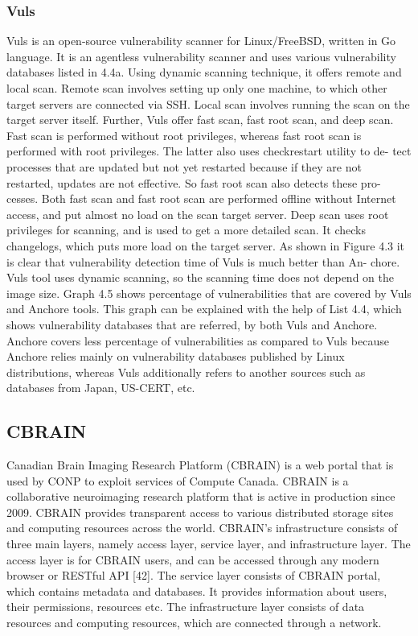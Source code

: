 \documentclass[a4paper,num-refs]{oup-contemporary}
\begin{document}
\subsubsection{Vuls}

Vuls is an open-source vulnerability scanner for Linux/FreeBSD, written in Go
language. It is an agentless vulnerability scanner and uses various
vulnerability databases listed in 4.4a. Using dynamic scanning technique, it offers
remote and local scan. Remote scan involves setting up only one machine, to
which other target servers are connected via SSH. Local scan involves running
the scan on the target server itself. Further, Vuls offer fast scan, fast root scan,
and deep scan.
Fast scan is performed without root privileges, whereas fast root scan is
performed with root privileges. The latter also uses checkrestart utility to de-
tect processes that are updated but not yet restarted because if they are not
restarted, updates are not effective. So fast root scan also detects these pro-
cesses. Both fast scan and fast root scan are performed offline without Internet
access, and put almost no load on the scan target server. Deep scan uses
root privileges for scanning, and is used to get a more detailed scan. It checks
changelogs, which puts more load on the target server. As shown in Figure 4.3
it is clear that vulnerability detection time of Vuls is much better than An-
chore. Vuls tool uses dynamic scanning, so the scanning time does not depend
on the image size.
Graph 4.5 shows percentage of vulnerabilities that are
covered by Vuls and Anchore tools. This graph can be explained with the help
of List 4.4, which shows vulnerability databases that are referred, by both Vuls
and Anchore. Anchore covers less percentage of vulnerabilities as compared
to Vuls because Anchore relies mainly on vulnerability databases published by
Linux distributions, whereas Vuls additionally refers to another sources such as
databases from Japan, US-CERT, etc.

\subsection{CBRAIN}

Canadian Brain Imaging Research Platform (CBRAIN) is a web portal that is used
by CONP to exploit services of Compute Canada. CBRAIN is a collaborative
neuroimaging research platform that is active in production since 2009. CBRAIN
provides transparent access to various distributed storage sites and computing
resources across the world. CBRAIN’s infrastructure consists of three main
layers, namely access layer, service layer, and infrastructure layer. The access
layer is for CBRAIN users, and can be accessed through any modern browser or
RESTful API [42]. The service layer consists of CBRAIN portal, which contains
metadata and databases. It provides information about users, their permissions,
resources etc. The infrastructure layer consists of data resources and computing
resources, which are connected through a network.



\end{document}
